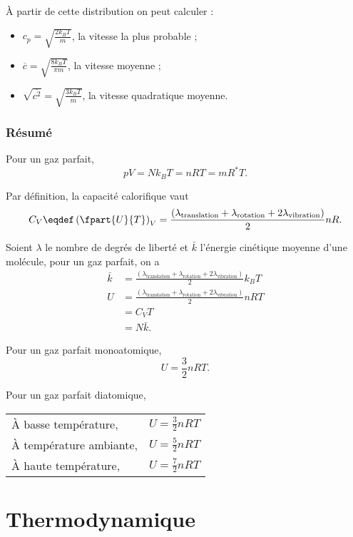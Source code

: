 À partir de cette distribution on peut calculer :

\begin{itemize}
	\item $c_p = \sqrt{\frac{2k_BT}{m}}$, la vitesse la plus probable ;
	\item $\overline{c} = \sqrt{\frac{8k_BT}{\pi m}}$, la vitesse moyenne ;
	\item $\sqrt{\overline{c^2}} = \sqrt{\frac{3k_BT}{m}}$, la vitesse quadratique moyenne.
\end{itemize}

\section{Résumé}

Pour un gaz parfait,
\[ pV = Nk_BT = nRT = mR^*T. \]

Par définition, la capacité calorifique vaut
\[ C_V \eqdef \left(\fpart{U}{T}\right)_V
= \frac{(\lambda_\mathrm{translation} + \lambda_\mathrm{rotation} +
2\lambda_\mathrm{vibration})}{2}nR. \]

Soient $\lambda$ le nombre de degrés de liberté
et $\bar k$ l'énergie cinétique moyenne d'une molécule,
pour un gaz parfait, on a
\begin{align*}
  \bar k & = \frac{(\lambda_\mathrm{translation} + \lambda_\mathrm{rotation} +
  2\lambda_\mathrm{vibration})}{2}k_BT\\
  U & = \frac{(\lambda_\mathrm{translation} + \lambda_\mathrm{rotation} +
  2\lambda_\mathrm{vibration})}{2}nRT\\
  & = C_V T\\
  & = N \bar k.
\end{align*}

Pour un gaz parfait monoatomique,
\[ U = \frac 32 nRT. \]

Pour un gaz parfait diatomique,
\begin{center}
  \begin{tabular}{|l|l|}
    \hline
    À basse température, &
    \( U = \frac 32 nRT \)\\
    À température ambiante, &
    \( U = \frac 52 nRT \)\\
    À haute température, &
    \( U = \frac 72 nRT \)\\
    \hline
  \end{tabular}
\end{center}

\part{Thermodynamique}
